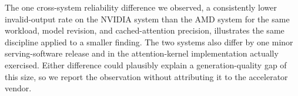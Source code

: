 The one cross-system reliability difference we observed, a consistently lower invalid-output rate on the NVIDIA system than the AMD system for the same workload, model revision, and cached-attention precision, illustrates the same discipline applied to a smaller finding. The two systems also differ by one minor serving-software release and in the attention-kernel implementation actually exercised. Either difference could plausibly explain a generation-quality gap of this size, so we report the observation without attributing it to the accelerator vendor.
